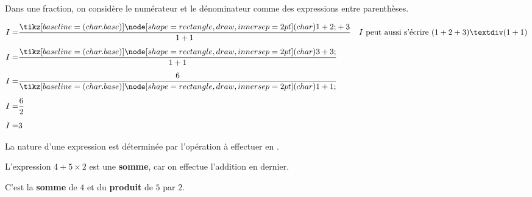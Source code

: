 \documentclass[../€Cours-complet/Cours-complet]{subfiles}
\begin{document}
\begin{cours}
	Dans une fraction, on considère le numérateur et le dénominateur comme des expressions entre parenthèses.
\end{cours}

\begin{exemple}
	\renewcommand{\arraystretch}{1.5}
	\begin{align*}
		I = & \frac{\squared{1 + 2} + 3}{1+1} & I\text{ peut aussi s'écrire }(1+2+3)÷(1+1) \\[0.5em]
		I = & \frac{\squared{3 + 3}}{1+1}     &                                            \\[0.5em]
		I = & \frac{6}{\squared{1+1}   }      &                                            \\[0.5em]
		I = & \frac{6}{2}                     &                                            \\[0.5em]
		I = & 3                               &
	\end{align*}
	\renewcommand{\arraystretch}{1}
\end{exemple}

\begin{cours}
	La nature d'une expression est déterminée par l'opération à effectuer en .
\end{cours}

\begin{exemple}
	L'expression $4 + 5 × 2$ est une \textbf{somme}, car on effectue l'addition en dernier.

	C'est la \textbf{somme} de $4$ et du \textbf{produit} de $5$ par $2$.
\end{exemple}
\end{document}
